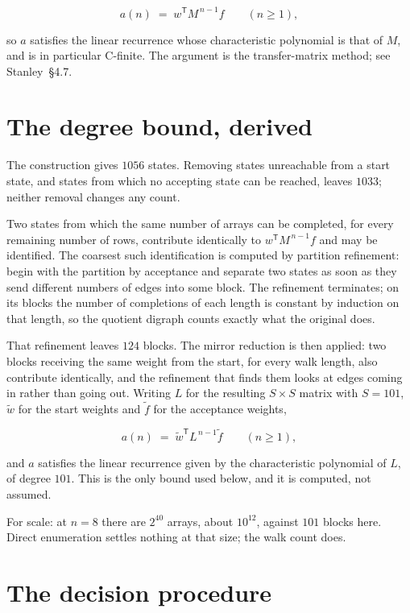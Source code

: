 \documentclass[11pt]{article}
\theoremstyle{definition}
\begin{document}
\[a(n) \;=\; w^{\mathsf T} M^{\,n-1} f \qquad (n \ge 1),\]

so $a$ satisfies the linear recurrence whose characteristic polynomial is that of $M$, and is in particular C-finite. The argument is the transfer-matrix method; see Stanley~\S4.7.

\section{The degree bound, derived}

The construction gives $1056$ states. Removing states unreachable from a start state, and states from which no accepting state can be reached, leaves $1033$; neither removal changes any count.

Two states from which the same number of arrays can be completed, for every remaining number of rows, contribute identically to $w^{\mathsf T}M^{\,n-1}f$ and may be identified. The coarsest such identification is computed by partition refinement: begin with the partition by acceptance and separate two states as soon as they send different numbers of edges into some block. The refinement terminates; on its blocks the number of completions of each length is constant by induction on that length, so the quotient digraph counts exactly what the original does.

That refinement leaves $124$ blocks. The mirror reduction is then applied: two blocks receiving the same weight from the start, for every walk length, also contribute identically, and the refinement that finds them looks at edges coming in rather than going out. Writing $L$ for the resulting $S \times S$ matrix with $S = 101$, $\tilde w$ for the start weights and $\tilde f$ for the acceptance weights,

\[a(n) \;=\; \tilde w^{\mathsf T} L^{\,n-1} \tilde f \qquad (n \ge 1),\]

and $a$ satisfies the linear recurrence given by the characteristic polynomial of $L$, of degree $101$. This is the only bound used below, and it is computed, not assumed.

For scale: at $n = 8$ there are $2^{40}$ arrays, about $10^{12}$, against $101$ blocks here. Direct enumeration settles nothing at that size; the walk count does.

\section{The decision procedure}
\end{document}
